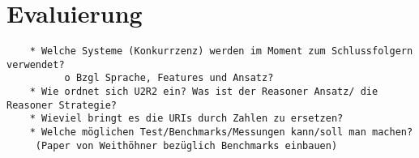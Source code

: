 \chapter{Evaluierung}

\begin{verbatim}
    * Welche Systeme (Konkurrzenz) werden im Moment zum Schlussfolgern verwendet?
          o Bzgl Sprache, Features und Ansatz? 
    * Wie ordnet sich U2R2 ein? Was ist der Reasoner Ansatz/ die Reasoner Strategie?
    * Wieviel bringt es die URIs durch Zahlen zu ersetzen?
    * Welche möglichen Test/Benchmarks/Messungen kann/soll man machen? 
     (Paper von Weithöhner bezüglich Benchmarks einbauen)
\end{verbatim}
